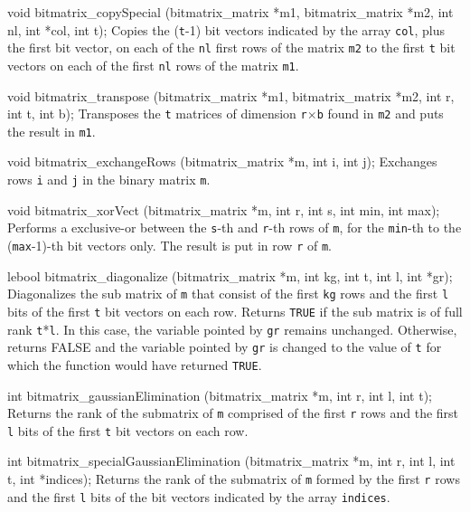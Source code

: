 void bitmatrix_copySpecial (bitmatrix_matrix *m1, bitmatrix_matrix *m2, 
                            int nl, int *col, int t);
\endcode
 \tab
Copies the ({\tt t}-1) bit vectors indicated by the array {\tt col}, 
plus the first bit vector, on each of the {\tt nl} first rows of the matrix 
{\tt m2} to the first {\tt t} bit vectors
on each of the first {\tt nl} rows of the matrix {\tt m1}.
 \endtab
\code

void bitmatrix_transpose (bitmatrix_matrix *m1, bitmatrix_matrix *m2, 
                          int r, int t, int b);
\endcode
 \tab
Transposes the {\tt t} matrices of dimension {\tt r}$\times${\tt b} 
found in {\tt m2} and puts the result in {\tt m1}. 
 \endtab
\code

void bitmatrix_exchangeRows (bitmatrix_matrix *m, int i, int j);
\endcode
 \tab
Exchanges rows {\tt i} and {\tt j} in the binary matrix {\tt *m}.
 \endtab
\code

void bitmatrix_xorVect (bitmatrix_matrix *m, int r, int s, int min, int max);
\endcode
 \tab
Performs a exclusive-or between the {\tt s}-th and {\tt r}-th rows of {\tt m},
for the {\tt min}-th to the ({\tt max}-1)-th bit vectors only.  
The result is put in row {\tt r} of {\tt m}.
 \endtab
\code 

lebool bitmatrix_diagonalize (bitmatrix_matrix *m, int kg, int t, int l, int *gr);
\endcode
\tab
Diagonalizes the sub matrix of {\tt m} that consist of the first {\tt kg} rows 
and the first {\tt l} bits of the first {\tt t} bit vectors on each row.
Returns {\tt TRUE} if the sub matrix is of full rank {\tt t}*{\tt l}.  
In this case, the variable pointed by {\tt gr} remains unchanged.  
Otherwise, returns FALSE and the variable pointed by {\tt gr} is changed 
to the value of {\tt t} for which the function would have returned {\tt TRUE}.
 \endtab
\code

int bitmatrix_gaussianElimination (bitmatrix_matrix *m, int r, int l, int t);
\endcode
 \tab
Returns the rank of the submatrix of {\tt m} comprised of the first {\tt r} rows 
and the first {\tt l} bits of the first {\tt t} bit vectors on each row.
 \endtab
\code

int bitmatrix_specialGaussianElimination (bitmatrix_matrix *m, 
                                          int r, int l, int t, int *indices);
\endcode
 \tab
Returns the rank of the submatrix of {\tt m} formed by the first {\tt r} rows 
and the first {\tt l} bits of the bit vectors indicated by the array {\tt indices}.
 \endtab
 \code

